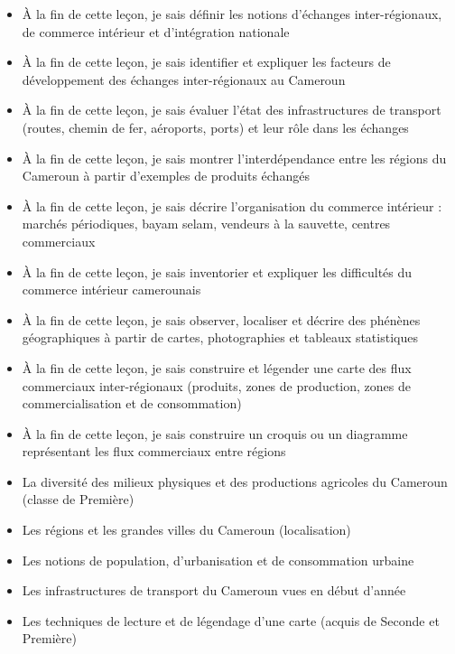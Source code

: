 \documentclass[11pt]{article}
\begin{document}
\begin{objectifs}
\begin{itemize}
\item À la fin de cette leçon, je sais définir les notions d'échanges inter-régionaux, de commerce intérieur et d'intégration nationale
\item À la fin de cette leçon, je sais identifier et expliquer les facteurs de développement des échanges inter-régionaux au Cameroun
\item À la fin de cette leçon, je sais évaluer l'état des infrastructures de transport (routes, chemin de fer, aéroports, ports) et leur rôle dans les échanges
\item À la fin de cette leçon, je sais montrer l'interdépendance entre les régions du Cameroun à partir d'exemples de produits échangés
\item À la fin de cette leçon, je sais décrire l'organisation du commerce intérieur : marchés périodiques, bayam selam, vendeurs à la sauvette, centres commerciaux
\item À la fin de cette leçon, je sais inventorier et expliquer les difficultés du commerce intérieur camerounais
\item À la fin de cette leçon, je sais observer, localiser et décrire des phénènes géographiques à partir de cartes, photographies et tableaux statistiques
\item À la fin de cette leçon, je sais construire et légender une carte des flux commerciaux inter-régionaux (produits, zones de production, zones de commercialisation et de consommation)
\item À la fin de cette leçon, je sais construire un croquis ou un diagramme représentant les flux commerciaux entre régions
\end{itemize}
\end{objectifs}

\begin{prerequis}
\begin{itemize}
\item La diversité des milieux physiques et des productions agricoles du Cameroun (classe de Première)
\item Les régions et les grandes villes du Cameroun (localisation)
\item Les notions de population, d'urbanisation et de consommation urbaine
\item Les infrastructures de transport du Cameroun vues en début d'année
\item Les techniques de lecture et de légendage d'une carte (acquis de Seconde et Première)
\end{itemize}
\end{prerequis}
\end{document}
